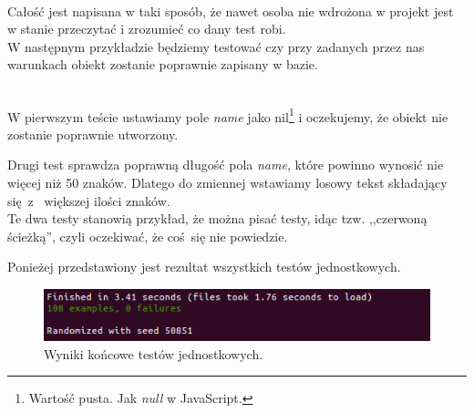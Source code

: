 \begin{code}
	
\end{code}\\

Całość jest napisana w taki sposób, że nawet osoba nie wdrożona w projekt jest w stanie przeczytać i zrozumieć co dany test robi.
\\

W następnym przykładzie będziemy testować czy przy zadanych przez nas warunkach obiekt zostanie poprawnie zapisany w bazie.

\begin{code}
	
\end{code}\\

W pierwszym teście ustawiamy pole \emph{name} jako nil\footnote{Wartość pusta. Jak \emph{null} w JavaScript.} i oczekujemy, że obiekt nie zostanie poprawnie utworzony.

Drugi test sprawdza poprawną długość pola \emph{name}, które powinno wynosić nie więcej niż 50 znaków. Dlatego do zmiennej wstawiamy losowy tekst składający się z~ większej ilości znaków.\\

Te dwa testy stanowią przykład, że można pisać testy, idąc tzw. ,,czerwoną ścieżką'', czyli oczekiwać, że coś się nie powiedzie.

Ponieżej przedstawiony jest rezultat wszystkich testów jednostkowych.

\begin{figure}[h]
  \centering
  \includegraphics[scale=0.8]{images/rspec_result.png}
  \caption{Wyniki końcowe testów jednostkowych.}
\end{figure}
